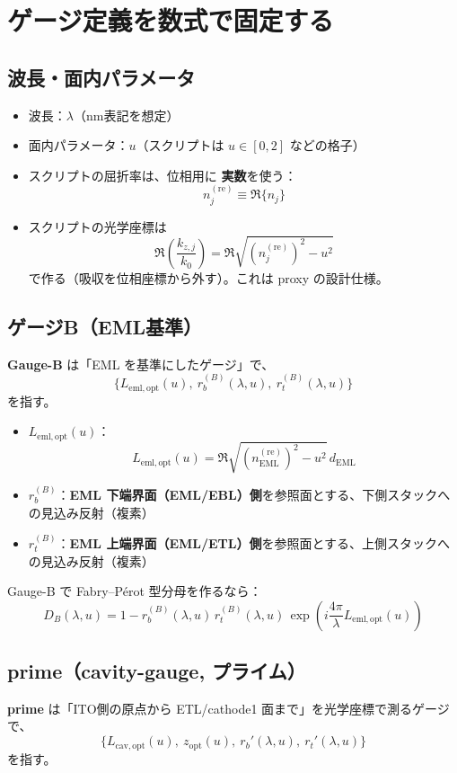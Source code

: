 \documentclass[a4paper,11pt]{article}
\begin{document}
\section{ゲージ定義を数式で固定する}

\subsection{波長・面内パラメータ}
\begin{itemize}
\item 波長：\(\lambda\)（nm表記を想定）
\item 面内パラメータ：\(u\)（スクリプトは \(u\in[0,2]\) などの格子）
\item スクリプトの屈折率は、位相用に \textbf{実数}を使う：
\[
n_j^{(\mathrm{re})} \equiv \Re\{n_j\}
\]
\item スクリプトの光学座標は
\[
\Re\left(\frac{k_{z,j}}{k_0}\right)=\Re\sqrt{(n_j^{(\mathrm{re})})^2-u^2}
\]
で作る（吸収を位相座標から外す）。これは proxy の設計仕様。
\end{itemize}

\subsection{ゲージB（EML基準）}
\textbf{Gauge-B} は「EML を基準にしたゲージ」で、
\[
\{L_{\mathrm{eml,opt}}(u),\ r_b^{(B)}(\lambda,u),\ r_t^{(B)}(\lambda,u)\}
\]
を指す。

\begin{itemize}
\item \(L_{\mathrm{eml,opt}}(u)\)：
\[
\boxed{
L_{\mathrm{eml,opt}}(u)=
\Re\sqrt{(n_{\mathrm{EML}}^{(\mathrm{re})})^2-u^2}\,d_{\mathrm{EML}}
}
\]
\item \(r_b^{(B)}\)：\textbf{EML 下端界面（EML/EBL）側}を参照面とする、下側スタックへの見込み反射（複素）
\item \(r_t^{(B)}\)：\textbf{EML 上端界面（EML/ETL）側}を参照面とする、上側スタックへの見込み反射（複素）
\end{itemize}

Gauge-B で Fabry--Pérot 型分母を作るなら：
\[
\boxed{
D_B(\lambda,u)=
1-r_b^{(B)}(\lambda,u)\,r_t^{(B)}(\lambda,u)\,
\exp\!\left(i\frac{4\pi}{\lambda}L_{\mathrm{eml,opt}}(u)\right)
}
\]

\subsection{prime（cavity-gauge, プライム）}
\textbf{prime} は「ITO側の原点から ETL/cathode1 面まで」を光学座標で測るゲージで、
\[
\{L_{\mathrm{cav,opt}}(u),\ z_{\mathrm{opt}}(u),\ r_b'(\lambda,u),\ r_t'(\lambda,u)\}
\]
を指す。
\end{document}
